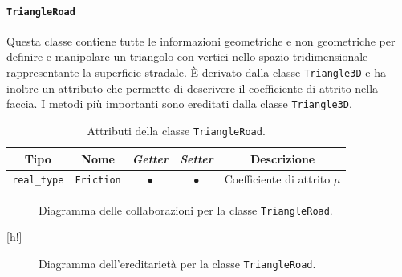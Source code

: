 \paragraph{\texttt{TriangleRoad}}
Questa classe contiene tutte le informazioni geometriche e non geometriche per definire e manipolare un triangolo con vertici nello spazio tridimensionale rappresentante la superficie stradale. È derivato dalla classe \texttt{Triangle3D} e ha inoltre un attributo che permette di descrivere il coefficiente di attrito nella faccia. I metodi più importanti sono ereditati dalla classe \texttt{Triangle3D}.
%
\begin{table}[h!]
	\centering
	\begin{tabular}{|c|c|c|c|c|}
		\hline 
		\textbf{Tipo} & \textbf{Nome} & \textit{\textbf{Getter}} & \textit{\textbf{Setter}} & \textbf{Descrizione} \\ \hline 
		\texttt{real\_type} & \texttt{Friction} & $\bullet$ & $\bullet$ & Coefficiente di attrito $\mu$ \\ \hline
	\end{tabular}
	\caption{Attributi della classe \texttt{TriangleRoad}.}
\end{table}
%
\begin{figure}[h!]
	\centering
	\caption{Diagramma delle collaborazioni per la classe \texttt{TriangleRoad}.}
\end{figure}[h!]
\begin{figure}\textbf{}
	\centering
	\caption{Diagramma dell'ereditarietà per la classe \texttt{TriangleRoad}.}
\end{figure}
%
